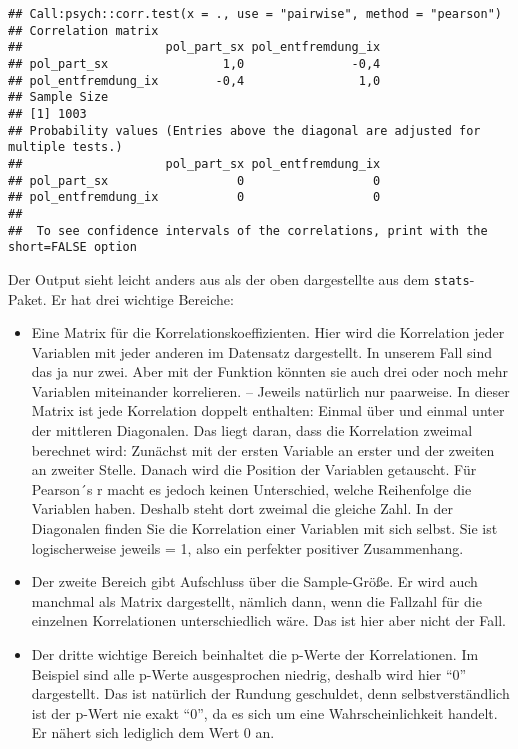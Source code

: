 \documentclass[
]{book}
\begin{document}
\begin{verbatim}
## Call:psych::corr.test(x = ., use = "pairwise", method = "pearson")
## Correlation matrix 
##                    pol_part_sx pol_entfremdung_ix
## pol_part_sx                1,0               -0,4
## pol_entfremdung_ix        -0,4                1,0
## Sample Size 
## [1] 1003
## Probability values (Entries above the diagonal are adjusted for multiple tests.) 
##                    pol_part_sx pol_entfremdung_ix
## pol_part_sx                  0                  0
## pol_entfremdung_ix           0                  0
## 
##  To see confidence intervals of the correlations, print with the short=FALSE option
\end{verbatim}

Der Output sieht leicht anders aus als der oben dargestellte aus dem \texttt{stats}-Paket. Er hat drei wichtige Bereiche:

\begin{itemize}
\item
  Eine Matrix für die Korrelationskoeffizienten. Hier wird die Korrelation jeder Variablen mit jeder anderen im Datensatz dargestellt. In unserem Fall sind das ja nur zwei. Aber mit der Funktion könnten sie auch drei oder noch mehr Variablen miteinander korrelieren. -- Jeweils natürlich nur paarweise. In dieser Matrix ist jede Korrelation doppelt enthalten: Einmal über und einmal unter der mittleren Diagonalen. Das liegt daran, dass die Korrelation zweimal berechnet wird: Zunächst mit der ersten Variable an erster und der zweiten an zweiter Stelle. Danach wird die Position der Variablen getauscht. Für Pearson´s r macht es jedoch keinen Unterschied, welche Reihenfolge die Variablen haben. Deshalb steht dort zweimal die gleiche Zahl. In der Diagonalen finden Sie die Korrelation einer Variablen mit sich selbst. Sie ist logischerweise jeweils = 1, also ein perfekter positiver Zusammenhang.
\item
  Der zweite Bereich gibt Aufschluss über die Sample-Größe. Er wird auch manchmal als Matrix dargestellt, nämlich dann, wenn die Fallzahl für die einzelnen Korrelationen unterschiedlich wäre. Das ist hier aber nicht der Fall.
\item
  Der dritte wichtige Bereich beinhaltet die p-Werte der Korrelationen. Im Beispiel sind alle p-Werte ausgesprochen niedrig, deshalb wird hier ``0'' dargestellt. Das ist natürlich der Rundung geschuldet, denn selbstverständlich ist der p-Wert nie exakt ``0'', da es sich um eine Wahrscheinlichkeit handelt. Er nähert sich lediglich dem Wert 0 an.
\end{itemize}
\end{document}
